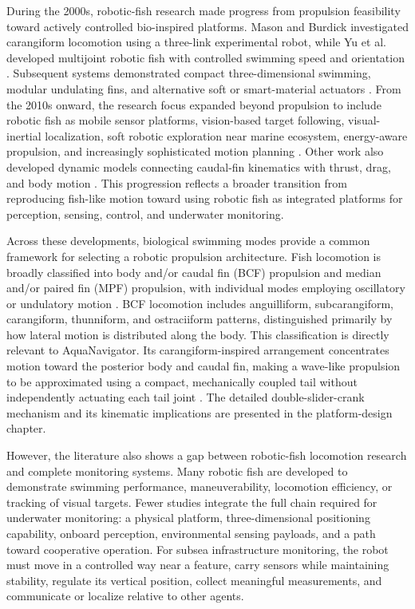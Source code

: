 \documentclass{uhcoethesis}
\begin{document}
During the 2000s, robotic-fish research made progress from propulsion feasibility toward actively controlled bio-inspired platforms. Mason and Burdick investigated carangiform locomotion using a three-link experimental robot, while Yu et al. developed multijoint robotic fish with controlled swimming speed and orientation \cite{Mason2000,Yu2004,Yu2005}. Subsequent systems demonstrated compact three-dimensional swimming, modular undulating fins, and alternative soft or smart-material actuators \cite{Liu2005,Low2006,Chen2010}. From the 2010s onward, the research focus expanded beyond propulsion to include robotic fish as mobile sensor platforms, vision-based target following, visual-inertial localization, soft robotic exploration near marine ecosystem, energy-aware propulsion, and increasingly sophisticated motion planning \cite{Tan2011,Hu2009,Wang2015,Katzschmann2018,Li2024,Jiang2024}. Other work also developed dynamic models connecting caudal-fin kinematics with thrust, drag, and body motion \cite{Wang2013,Park2012}. This progression reflects a broader transition from reproducing fish-like motion toward using robotic fish as integrated platforms for perception, sensing, control, and underwater monitoring.

Across these developments, biological swimming modes provide a common framework for selecting a robotic propulsion architecture. Fish locomotion is broadly classified into body and/or caudal fin (BCF) propulsion and median and/or paired fin (MPF) propulsion, with individual modes employing oscillatory or undulatory motion \cite{Sfakiotakis1999}. BCF locomotion includes anguilliform, subcarangiform, carangiform, thunniform, and ostraciiform patterns, distinguished primarily by how lateral motion is distributed along the body. This classification is directly relevant to AquaNavigator. Its carangiform-inspired arrangement concentrates motion toward the posterior body and caudal fin, making a wave-like propulsion to be approximated using a compact, mechanically coupled tail without independently actuating each tail joint \cite{Xie2021,Zuo2021}. The detailed double-slider-crank mechanism and its kinematic implications are presented in the platform-design chapter.

However, the literature also shows a gap between robotic-fish locomotion research and complete monitoring systems. Many robotic fish are developed to demonstrate swimming performance, maneuverability, locomotion efficiency, or tracking of visual targets. Fewer studies integrate the full chain required for underwater monitoring: a physical platform, three-dimensional positioning capability, onboard perception, environmental sensing payloads, and a path toward cooperative operation. For subsea infrastructure monitoring, the robot must move in a controlled way near a feature, carry sensors while maintaining stability, regulate its vertical position, collect meaningful measurements, and communicate or localize relative to other agents.
\end{document}
